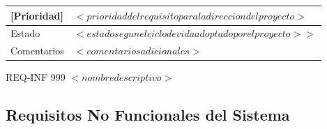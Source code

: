 \begin{Artefacto}[H]
\begin{tabular}{|p{3cm}|p{10cm}|}
         \hline
         \cellcolor{gray30}  [Prioridad] &  	$<prioridad del requisito para la direccion del proyecto>$\\
         \hline
         \cellcolor{gray30}  Estado	&$<estado  segun el ciclo de vida adoptado por el proyecto>>$\\   
        \hline       
         \cellcolor{gray30}  Comentarios	& $<comentarios adicionales>$ \\   
        \hline
  
    \end{tabular}
\caption{REQ-INF 999	$<nombre descriptivo>$ }
  \end{Artefacto}






\subsection{Requisitos No Funcionales del Sistema}





